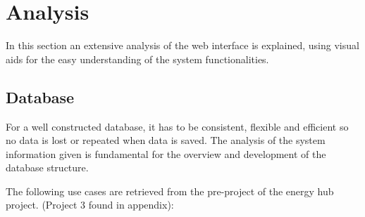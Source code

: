 \section{Analysis}
In this section an extensive analysis of the web interface is explained, using visual aids for the easy understanding of the system functionalities.

\subsection{Database}
For a well constructed database, it has to be consistent, flexible and efficient so no data is lost or repeated when data is saved. The analysis of the system information given is fundamental for the overview and development of the database structure.

The following use cases are retrieved from the pre-project of the energy hub project. (Project 3 found in appendix):
